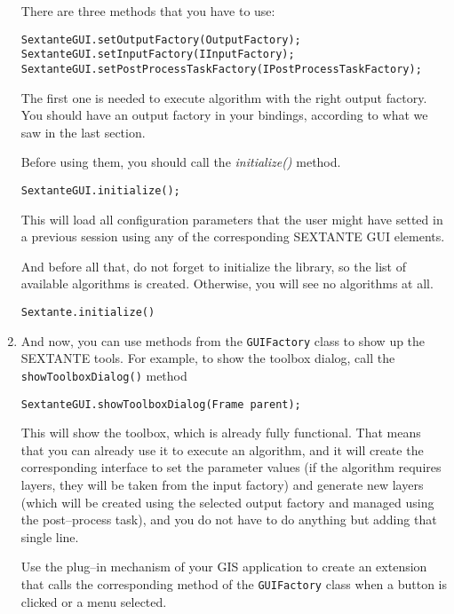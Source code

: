 \begin{enumerate}
There are three methods that you have to use:

\begin{verbatim}
SextanteGUI.setOutputFactory(OutputFactory);
SextanteGUI.setInputFactory(IInputFactory);
SextanteGUI.setPostProcessTaskFactory(IPostProcessTaskFactory);
\end{verbatim}

The first one is needed to execute algorithm with the right output factory. You should have an output factory in your bindings, according to what we saw in the last section.

Before using them, you should call the \emph{initialize()} method.

\begin{verbatim}
SextanteGUI.initialize();
\end{verbatim}
  
This will load all configuration parameters that the user might have setted in a previous session using any of the corresponding SEXTANTE GUI elements.

And before all that, do not forget to initialize the library, so the list of available algorithms is created. Otherwise, you will see no algorithms at all.

\begin{verbatim}
Sextante.initialize()
\end{verbatim}

\item And now, you can use methods from the \texttt{GUIFactory} class to show up the SEXTANTE tools. For example, to show the toolbox dialog, call the \texttt{showToolboxDialog()} method

\begin{verbatim}
SextanteGUI.showToolboxDialog(Frame parent);
\end{verbatim}

This will show the toolbox, which is already fully functional. That means that you can already use it to execute an algorithm, and it will create the corresponding interface to set the parameter values (if the algorithm requires layers, they will be taken from the input factory) and generate new layers (which will be created using the selected output factory and managed using the post--process task), and you do not have to do anything but adding that single line.

Use the plug--in mechanism of your GIS application to create an extension that calls the corresponding method of the \texttt{GUIFactory} class when a button is clicked or a menu selected.
\end{enumerate}
